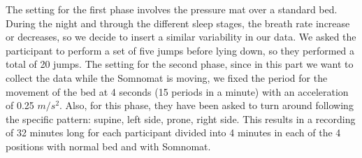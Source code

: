The setting for the first phase involves the pressure mat over a standard bed. During the night and through the different sleep stages, the breath rate increase or decreases, so we decide to insert a similar variability in our data. We asked the participant to perform a set of five jumps before lying down, so they performed a total of 20 jumps.
The setting for the second phase, since in this part we want to collect the data while the Somnomat is moving, we fixed the period for the movement of the bed at 4 seconds (15 periods in a minute) with an acceleration of 0.25 $m/s^2$. Also, for this phase, they have been asked to turn around following the specific pattern: supine, left side, prone, right side.
This results in a recording of 32 minutes long for each participant divided into 4 minutes in each of the 4 positions with normal bed and with Somnomat.


